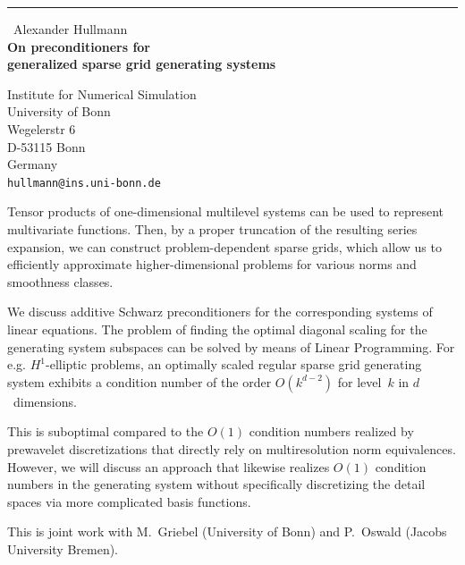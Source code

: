 \documentclass{report}
\begin{document}
\begin{center}
\rule{6in}{1pt} \
{\large Alexander Hullmann \\
{\bf On preconditioners for\\generalized sparse grid generating systems}}

Institute for Numerical Simulation \\ University of Bonn \\ Wegelerstr 6 \\ D-53115 Bonn \\ Germany
\\
{\tt hullmann@ins.uni-bonn.de}\end{center}

Tensor products of one-dimensional multilevel systems can be used to
represent multivariate functions. Then, by a proper truncation of the
resulting series expansion, we can construct problem-dependent sparse
grids, which allow us to efficiently approximate higher-dimensional
problems for various norms and smoothness classes.

We discuss additive Schwarz preconditioners for the corresponding systems
of linear equations. The problem of finding the optimal diagonal scaling
for the generating system subspaces can be solved by means of Linear
Programming. For e.g. $H^1$-elliptic problems, an optimally scaled
regular sparse grid generating system exhibits a condition number of the
order $O(k^{d-2})$ for level~$k$ in $d$~dimensions.

This is suboptimal compared to the $O(1)$ condition numbers realized by
prewavelet discretizations that directly rely on multiresolution norm
equivalences. However, we will discuss an approach that likewise realizes
$O(1)$ condition numbers in the generating system without specifically
discretizing the detail
spaces via more complicated basis functions.

This is joint work with M.~Griebel (University of Bonn) and P.~Oswald
(Jacobs University Bremen).
\end{document}
